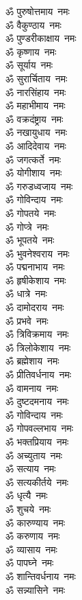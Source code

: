 \begin{multicols}{2}
\begin{flushleft}
ॐ पुरुषोत्तमाय~नमः\\
ॐ वैकुण्ठाय~नमः\\
ॐ पुण्डरीकाक्षाय~नमः\\
ॐ कृष्णाय~नमः\hfill{}\\
ॐ सूर्याय~नमः\\
ॐ सुरार्चिताय~नमः\\
ॐ नारसिंहाय~नमः\\
ॐ महाभीमाय~नमः\\
ॐ वक्रदंष्ट्राय~नमः\\
ॐ नखायुधाय~नमः\\
ॐ आदिदेवाय~नमः\\
ॐ जगत्कर्ते~नमः\\
ॐ योगीशाय~नमः\\
ॐ गरुडध्वजाय~नमः\hfill{}\\
ॐ गोविन्दाय~नमः\\
ॐ गोपतये~नमः\\
ॐ गोप्त्रे~नमः\\
ॐ भूपतये~नमः\\
ॐ भुवनेश्वराय~नमः\\
ॐ पद्मनाभाय~नमः\\
ॐ हृषीकेशाय~नमः\\
ॐ धात्रे~नमः\\
ॐ दामोदराय~नमः\\
ॐ प्रभवे~नमः\hfill{}\\
ॐ त्रिविक्रमाय~नमः\\
ॐ त्रिलोकेशाय~नमः\\
ॐ ब्रह्मेशाय~नमः\\
ॐ प्रीतिवर्धनाय~नमः\\
ॐ वामनाय~नमः\\
ॐ दुष्टदमनाय~नमः\\
ॐ गोविन्दाय~नमः\\
ॐ गोपवल्लभाय~नमः\\
ॐ भक्तप्रियाय~नमः\\
ॐ अच्युताय~नमः\hfill{}\\
ॐ सत्याय~नमः\\
ॐ सत्यकीर्तये~नमः\\
ॐ धृत्यै~नमः\\
ॐ शुचये~नमः\\
ॐ कारुण्याय~नमः\\
ॐ करुणाय~नमः\\
ॐ व्यासाय~नमः\\
ॐ पापघ्ने~नमः\\
ॐ शान्तिवर्धनाय~नमः\\
ॐ सन्न्यासिने~नमः\hfill{}\\

\end{flushleft}
\end{multicols}
